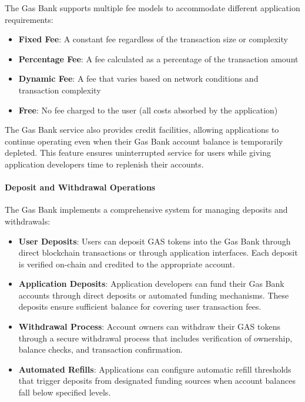 \documentclass{article}
\begin{document}
The Gas Bank supports multiple fee models to accommodate different application requirements:

\begin{itemize}
    \item \textbf{Fixed Fee}: A constant fee regardless of the transaction size or complexity
    \item \textbf{Percentage Fee}: A fee calculated as a percentage of the transaction amount
    \item \textbf{Dynamic Fee}: A fee that varies based on network conditions and transaction complexity
    \item \textbf{Free}: No fee charged to the user (all costs absorbed by the application)
\end{itemize}

The Gas Bank service also provides credit facilities, allowing applications to continue operating even when their Gas Bank account balance is temporarily depleted. This feature ensures uninterrupted service for users while giving application developers time to replenish their accounts.



\paragraph{Deposit and Withdrawal Operations}
The Gas Bank implements a comprehensive system for managing deposits and withdrawals:

\begin{itemize}
    \item \textbf{User Deposits}: Users can deposit GAS tokens into the Gas Bank through direct blockchain transactions or through application interfaces. Each deposit is verified on-chain and credited to the appropriate account.
    
    \item \textbf{Application Deposits}: Application developers can fund their Gas Bank accounts through direct deposits or automated funding mechanisms. These deposits ensure sufficient balance for covering user transaction fees.
    
    \item \textbf{Withdrawal Process}: Account owners can withdraw their GAS tokens through a secure withdrawal process that includes verification of ownership, balance checks, and transaction confirmation.
    
    \item \textbf{Automated Refills}: Applications can configure automatic refill thresholds that trigger deposits from designated funding sources when account balances fall below specified levels.
\end{itemize}
\end{document}
